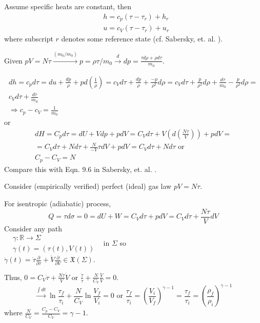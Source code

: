 \documentclass[twoside,landscape,10pt]{amsart}
\theoremstyle{plain}
\theoremstyle{definition}
\theoremstyle{remark}
\theoremstyle{remark}
\begin{document}
\begin{multicols*}{2}
Assume specific heats are constant, then 
\[
\begin{aligned}
& h = c_p (\tau - \tau_r) + h_r \\ 
& u = c_V (\tau - \tau_r) + u_r
\end{aligned}
\]
where subscript $r$ denotes some reference state (cf. Sabersky, et. al. \cite{SAHG1998}).

Given $pV = N\tau \xrightarrow{ (m_0 / m_0) } p = \rho \tau / m_0 \xrightarrow{d} dp = \frac{ \tau d\rho + \rho d\tau }{m_0} $.

\[
\begin{gathered}
dh = c_p d\tau = du + \frac{dp}{ \rho } + p d\left(\frac{1}{\rho} \right) = c_V d\tau + \frac{dp}{\rho } + \frac{-p}{\rho^2} d\rho = c_V d\tau + \frac{p}{\rho^2 } d\rho + \frac{d\tau }{m_0} - \frac{p}{\rho^2 } d\rho = \\
c_V d\tau + \frac{ d\tau}{m_0} \\
\Longrightarrow c_p - c_V = \frac{1}{m_0}
\end{gathered}
\]
or
\begin{equation}
\begin{gathered}
dH = C_p d\tau = dU + Vdp + pdV = C_V d\tau + V (d\left(\frac{N\tau}{V}\right) ) + p dV = \\
= C_V d\tau + Nd\tau + \frac{N}{-V} \tau dV + pdV = C_V d\tau + Nd\tau \text{ or }  \\ 
\boxed{ C_p - C_V = N}
\end{gathered}
\end{equation}
Compare this with Eqn. 9.6 in Sabersky, et. al. \cite{SAHG1998}.

Consider (empirically verified) perfect (ideal) gas law $pV = N\tau$. 

For isentropic (adiabatic) process, 
\[
Q = \tau d\sigma = 0 = dU + W = C_V d\tau + pdV = C_V d\tau + \frac{N\tau}{V} dV 
\]
Consider any path \\
$\begin{aligned} 
& \gamma : \mathbb{R} \to \Sigma \\
& \gamma(t) = (\tau(t), V(t)) \end{aligned}$ \qquad \, in $\Sigma$ so \\
$\dot{\gamma}(t) = \dot{\tau} \frac{ \partial }{ \partial \tau } + \dot{V} \frac{ \partial }{ \partial V} \in \mathfrak{X}(\Sigma)$.

Thus, $0 = C_V \dot{\tau} + \frac{N\tau}{V} \dot{V}$ or $\frac{ \dot{\tau}}{\tau} + \frac{N}{C_V}\frac{\dot{V}}{V} = 0$.
\[
\xrightarrow{\int dt} \ln{ \frac{ \tau_f}{\tau_i} } + \frac{N}{C_V} \ln{ \frac{V_f}{V_i} }=  0 \text{ or } \frac{\tau_f}{\tau_i} = \left( \frac{V_i}{V_f} \right)^{\gamma - 1} = \frac{\tau_f}{\tau_i} = \left( \frac{\rho_f}{\rho_i} \right)^{\gamma - 1}
\]
where $\frac{N}{C_V} = \frac{C_p - C_V}{C_V} = \gamma -1$.


\end{multicols*}
\end{document}
